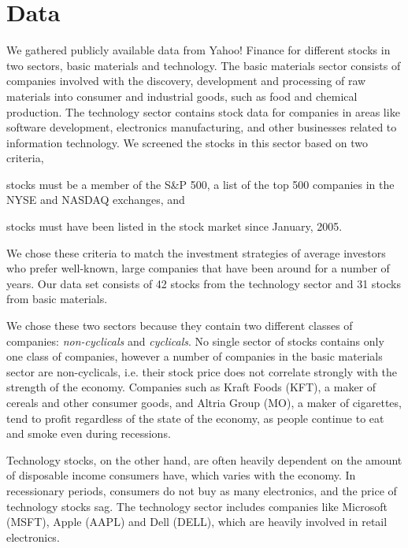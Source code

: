 \documentclass[10pt]{article}
\begin{document}
\section{Data}
\label{sec:data}
We gathered publicly available data from Yahoo! Finance\cite{Yahoo} for
different stocks in two sectors, basic materials and technology. The basic
materials sector consists of companies involved with the discovery, development
and processing of raw materials into consumer and industrial goods, such as
food and chemical production. The technology sector contains stock data for
companies in areas like software development, electronics manufacturing, and
other businesses related to information technology. We screened the stocks in
this sector based on two criteria, 
\begin{inparaenum}
    \item stocks must be a member of the S\&P 500, a list of the top 500 companies in the NYSE and NASDAQ exchanges, and
    \item stocks must have been listed in the stock market since January, 2005.
\end{inparaenum}
We chose these criteria to match the investment strategies of average
investors who prefer well-known, large companies that have been around for a
number of years. Our data set consists of 42 stocks from the technology sector
and 31 stocks from basic materials.

We chose these two sectors because they contain two different classes of
companies: \emph{non-cyclicals} and \emph{cyclicals}. No single sector of
stocks contains only one class of companies, however a number of companies in
the basic materials sector are non-cyclicals, i.e. their stock price does not
correlate strongly with the strength of the economy. Companies such as Kraft
Foods (KFT), a maker of cereals and other consumer goods, and Altria Group
(MO), a maker of cigarettes, tend to profit regardless of the state of the
economy, as people continue to eat and smoke even during recessions.

Technology stocks, on the other hand, are often heavily dependent on the amount
of disposable income consumers have, which varies with the economy. In
recessionary periods, consumers do not buy as many electronics, and the price
of technology stocks sag. The technology sector includes companies like
Microsoft (MSFT), Apple (AAPL) and Dell (DELL), which are heavily involved in
retail electronics.
\end{document}
